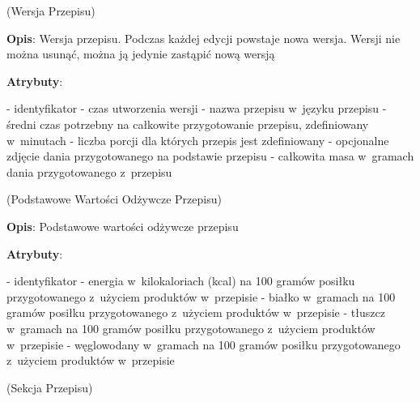 \begin{enumerate}[label={\textbf{KAT/\protect\threedigits{\theenumi}}}, wide, labelwidth=!, labelindent=0pt, labelsep=0pt, series=reqs]
    \label{kat:RecipeVersion} (Wersja Przepisu)

    \textbf{Opis}: Wersja przepisu. Podczas każdej edycji powstaje nowa wersja. Wersji nie można usunąć, można ją jedynie zastąpić nową wersją
    \par
    \textbf{Atrybuty}:
    \begin{itemize}[series=atr, wide, align=left, leftmargin=190pt]
        \label{kat:RecipeVersion:id}- identyfikator
        \label{kat:RecipeVersion:editTimestamp}- czas utworzenia wersji
        \label{kat:RecipeVersion:name}- nazwa przepisu w~języku przepisu
        \label{kat:RecipeVersion:preparationTimeMinutes}- średni czas potrzebny na całkowite przygotowanie przepisu, zdefiniowany w~minutach
        \label{kat:RecipeVersion:numberOfPortions}- liczba porcji dla których przepis jest zdefiniowany
        \label{kat:RecipeVersion:image}- opcjonalne zdjęcie dania przygotowanego na podstawie przepisu
        \label{kat:RecipeVersion:totalGramsWeight}- całkowita masa w~gramach dania przygotowanego z~przepisu
    \end{itemize}

    \label{kat:RecipeBasicNutritionData} (Podstawowe Wartości Odżywcze Przepisu)

    \textbf{Opis}: Podstawowe wartości odżywcze przepisu
    \par
    \textbf{Atrybuty}:
    \begin{itemize}[series=atr, wide, align=left, leftmargin=190pt]
        \label{kat:RecipeBasicNutritionData:id}- identyfikator
        \label{kat:RecipeBasicNutritionData:energy}- energia w~kilokaloriach (kcal) na 100 gramów posiłku przygotowanego z~użyciem produktów w~przepisie
        \label{kat:RecipeBasicNutritionData:protein}- białko w~gramach na 100 gramów posiłku przygotowanego z~użyciem produktów w~przepisie
        \label{kat:RecipeBasicNutritionData:fat}- tłuszcz w~gramach na 100 gramów posiłku przygotowanego z~użyciem produktów w~przepisie
        \label{kat:RecipeBasicNutritionData:carbohydrates}- węglowodany w~gramach na 100 gramów posiłku przygotowanego z~użyciem produktów w~przepisie
    \end{itemize}

    \label{kat:RecipeSection} (Sekcja Przepisu)


\end{enumerate}
